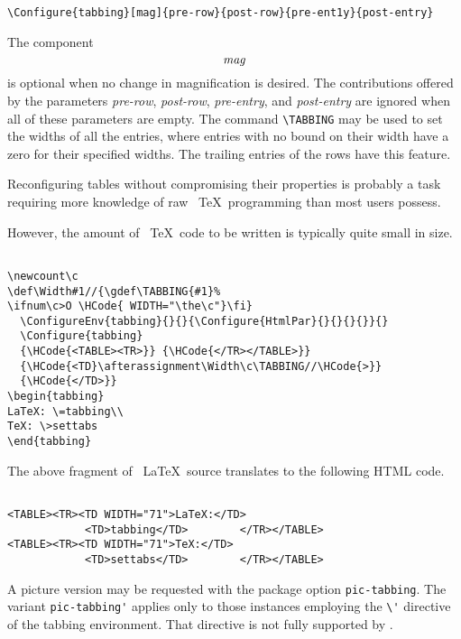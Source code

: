 \begin{lstlisting}
\Configure{tabbing}[mag]{pre-row}{post-row}{pre-ent1y}{post-entry} 
\end{lstlisting}

The component \[\emph{mag}\] is optional when no change in magnification
is desired. The contributions offered by the parameters \emph{pre-row},
\emph{post-row}, \emph{pre-entry}, and \emph{post-entry} are ignored
when all of these parameters are empty. The command \verb|\TABBING| may
be used to set the widths of all the entries, where entries with no
bound on their width have a zero for their specified widths. The
trailing entries of the rows have this feature. 

Reconfiguring tables without compromising their properties is probably a
task requiring more knowledge of raw \ \TeX\  programming than most
users possess. 
 
 
However, the amount of \ \TeX\  code to be written is typically quite small in size. 

\begin{lstlisting}

\newcount\c 
\def\Width#1//{\gdef\TABBING{#1}% 
\ifnum\c>O \HCode{ WIDTH="\the\c"}\fi} 
  \ConfigureEnv{tabbing}{}{}{\Configure{HtmlPar}{}{}{}{}}{} 
  \Configure{tabbing} 
  {\HCode{<TABLE><TR>}} {\HCode{</TR></TABLE>}} 
  {\HCode{<TD}\afterassignment\Width\c\TABBING//\HCode{>}} 
  {\HCode{</TD>}} 
\begin{tabbing} 
LaTeX: \=tabbing\\ 
TeX: \>settabs 
\end{tabbing} 

\end{lstlisting}

The above fragment of \ \LaTeX\  source translates to the following HTML code. 

\begin{lstlisting}

<TABLE><TR><TD WIDTH="71">LaTeX:</TD> 
            <TD>tabbing</TD>        </TR></TABLE> 
<TABLE><TR><TD WIDTH="71">TeX:</TD> 
            <TD>settabs</TD>        </TR></TABLE> 

\end{lstlisting}

A picture version may be requested with the package option
\verb|pic-tabbing|. The variant \verb|pic-tabbing'| applies only to
those instances employing the \verb|\'|  directive of the tabbing
environment. That directive is not fully supported by \texht. 


